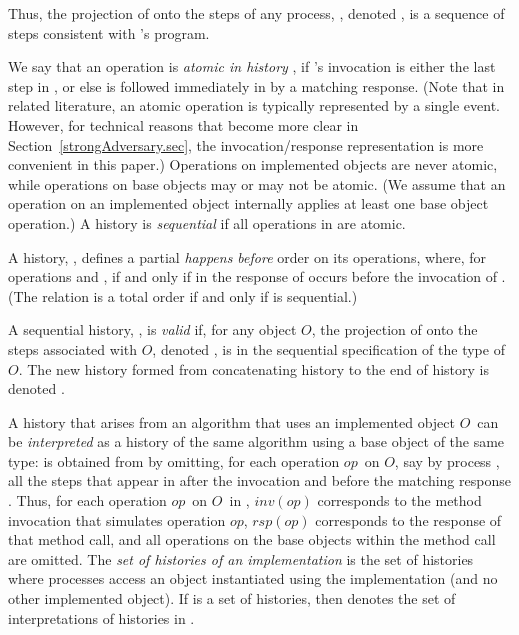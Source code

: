 \documentclass[11pt,letterpaper]{article}
\newcommand{\obj}{\ensuremath{\mathit{O}}}
\newcommand{\op}{\ensuremath{\mathit{op}}}
\newcommand{\inv}[1]{\ensuremath{inv(#1)}}
\newcommand{\rsp}[1]{\ensuremath{rsp(#1)}}
\begin{document}
Thus, the projection of  onto the steps of any process, , denoted , is a sequence of steps consistent with 's program.


We say that an operation  is \emph{atomic in history }, if 's invocation is either the last step in , or else is followed immediately in  by a matching response.
(Note that in related literature, an atomic operation is typically represented by a single event.
However, for technical reasons that become more clear in Section~\ref{strongAdversary.sec},  the invocation/response representation is more convenient in this paper.)
Operations on implemented objects are never atomic, while operations on base objects may or may not be atomic.
(We assume that an operation on an implemented object internally applies at least one base object operation.)
A history  is \emph{sequential} if all operations in  are atomic.

A history, , defines a partial \emph{happens before} order  on its operations, where, for operations  and ,  if and only if in  the response of  occurs before the invocation of .
(The relation  is a total order if and only if  is sequential.)


A sequential history, , is \emph{valid} if, for any object \obj, the projection of  onto the steps associated with \obj, denoted , is in the sequential specification of the type of \obj.
The new history formed from concatenating history  to the end of history  is denoted .

A  history that arises from an algorithm that uses an implemented object \obj\
can be \emph{interpreted} as a history  of the same algorithm using a base object of the same type:
 is obtained from  by omitting, for each operation \op\ on \obj, say by process ,
  all the steps that appear in  after the invocation  and before the matching response .
Thus, for each operation \op\ on \obj\ in ,
\inv{\op} corresponds to the method invocation that simulates operation \op,
\rsp{\op} corresponds to the response of that method call, and
all operations on the base objects within the method call are omitted.
The \emph{set of histories of an implementation} is the set of histories where processes access an object instantiated using the implementation (and no other implemented object).
If  is a set of histories, then  denotes the set of interpretations of histories in .
\end{document}

